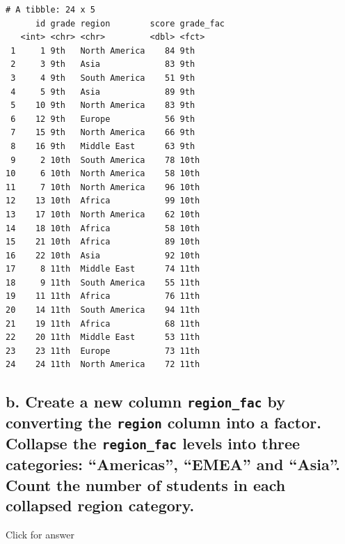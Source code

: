 \documentclass[
]{book}
\begin{document}
\begin{verbatim}
# A tibble: 24 x 5
      id grade region        score grade_fac
   <int> <chr> <chr>         <dbl> <fct>    
 1     1 9th   North America    84 9th      
 2     3 9th   Asia             83 9th      
 3     4 9th   South America    51 9th      
 4     5 9th   Asia             89 9th      
 5    10 9th   North America    83 9th      
 6    12 9th   Europe           56 9th      
 7    15 9th   North America    66 9th      
 8    16 9th   Middle East      63 9th      
 9     2 10th  South America    78 10th     
10     6 10th  North America    58 10th     
11     7 10th  North America    96 10th     
12    13 10th  Africa           99 10th     
13    17 10th  North America    62 10th     
14    18 10th  Africa           58 10th     
15    21 10th  Africa           89 10th     
16    22 10th  Asia             92 10th     
17     8 11th  Middle East      74 11th     
18     9 11th  South America    55 11th     
19    11 11th  Africa           76 11th     
20    14 11th  South America    94 11th     
21    19 11th  Africa           68 11th     
22    20 11th  Middle East      53 11th     
23    23 11th  Europe           73 11th     
24    24 11th  North America    72 11th     
\end{verbatim}

\hypertarget{b.-create-a-new-column-region_fac-by-converting-the-region-column-into-a-factor.-collapse-the-region_fac-levels-into-three-categories-americas-emea-and-asia.-count-the-number-of-students-in-each-collapsed-region-category.}{%
\subsection{\texorpdfstring{b. Create a new column \texttt{region\_fac} by converting the \texttt{region} column into a factor. Collapse the \texttt{region\_fac} levels into three categories: ``Americas'', ``EMEA'' and ``Asia''. Count the number of students in each collapsed region category.}{b. Create a new column region\_fac by converting the region column into a factor. Collapse the region\_fac levels into three categories: ``Americas'', ``EMEA'' and ``Asia''. Count the number of students in each collapsed region category.}}\label{b.-create-a-new-column-region_fac-by-converting-the-region-column-into-a-factor.-collapse-the-region_fac-levels-into-three-categories-americas-emea-and-asia.-count-the-number-of-students-in-each-collapsed-region-category.}}

Click for answer
\end{document}
